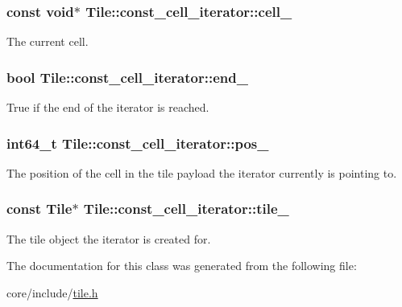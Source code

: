 \subsubsection[{cell\+\_\+}]{\setlength{\rightskip}{0pt plus 5cm}const void$\ast$ Tile\+::const\+\_\+cell\+\_\+iterator\+::cell\+\_\+\hspace{0.3cm}{\ttfamily [private]}}\label{classTile_1_1const__cell__iterator_aa85fe5a4880ed7df5b7b3bf1d988f7c2}
The current cell. \hypertarget{classTile_1_1const__cell__iterator_a552f82cd9463ee10ce7ee6dfc25dea18}{}
\subsubsection[{end\+\_\+}]{\setlength{\rightskip}{0pt plus 5cm}bool Tile\+::const\+\_\+cell\+\_\+iterator\+::end\+\_\+\hspace{0.3cm}{\ttfamily [private]}}\label{classTile_1_1const__cell__iterator_a552f82cd9463ee10ce7ee6dfc25dea18}
True if the end of the iterator is reached. \hypertarget{classTile_1_1const__cell__iterator_ad0f50c4bfcf45a0a4d02e593d8f3f17d}{}
\subsubsection[{pos\+\_\+}]{\setlength{\rightskip}{0pt plus 5cm}int64\+\_\+t Tile\+::const\+\_\+cell\+\_\+iterator\+::pos\+\_\+\hspace{0.3cm}{\ttfamily [private]}}\label{classTile_1_1const__cell__iterator_ad0f50c4bfcf45a0a4d02e593d8f3f17d}
The position of the cell in the tile payload the iterator currently is pointing to. \hypertarget{classTile_1_1const__cell__iterator_a31003989c807143306371faee80b98f4}{}
\subsubsection[{tile\+\_\+}]{\setlength{\rightskip}{0pt plus 5cm}const {\bf Tile}$\ast$ Tile\+::const\+\_\+cell\+\_\+iterator\+::tile\+\_\+\hspace{0.3cm}{\ttfamily [private]}}\label{classTile_1_1const__cell__iterator_a31003989c807143306371faee80b98f4}
The tile object the iterator is created for. 

The documentation for this class was generated from the following file\+:\begin{DoxyCompactItemize}
\item 
core/include/\hyperlink{tile_8h}{tile.\+h}\end{DoxyCompactItemize}
